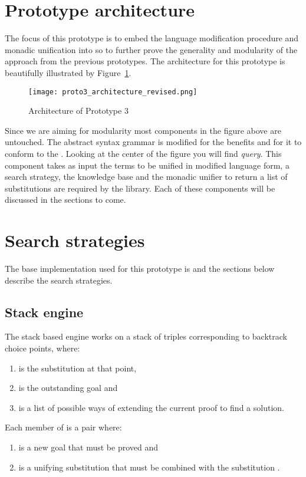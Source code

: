 \documentclass[thesis-solanki.tex]{files}
\begin{document}
\section{Prototype architecture}

The focus of this prototype is to embed the language modification procedure and monadic unification into \cite{website:mini-prolog-hugs98} so to further 
prove the generality and modularity of the approach from the previous prototypes. 
The architecture for this prototype is beautifully illustrated by Figure~\ref{fig:architecture-proto-3}. 

\begin{figure}[H]
  \texttt{[image: proto3\_architecture\_revised.png]}
\vspace*{-1cm}
  \caption{Architecture of Prototype 3}
  \label{fig:architecture-proto-3}
\end{figure}

Since we are aiming for modularity most components in the figure above are untouched. The abstract syntax grammar is modified for the benefits and for it
to conform to the  \cite{unification-fd-lib}.
Looking at the center of the figure you will find \textit{query}. This component takes as input the terms to be unified in modified language form, a 
search strategy, the knowledge base and the monadic unifier to return a list of substitutions are required by the library. Each of these components will be
discussed in the sections to come.   


\section{Search strategies}
The base implementation used for this prototype is \cite{website:mini-prolog-hugs98} and the sections below describe the search
strategies.

\subsection{Stack engine}
The stack based engine works on a stack of triples 
corresponding to backtrack choice points, where: 
\begin{enumerate}
\item {} is the substitution at that point,

\item {} is the outstanding goal and  

\item {} is a list of possible ways of extending the current proof to find a solution.   
\end{enumerate}
Each member of  is a pair  where: 
\begin{enumerate}
\item {} is a new goal that must be proved and 
\item {} is a unifying substitution that must be combined with the substitution .
\end{enumerate}
\end{document}
